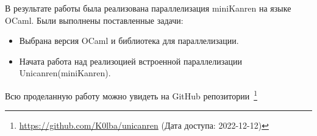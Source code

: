 

В результате работы была реализована параллелизация miniKanren на языке OCaml.
Были выполнены поставленные задачи:


\begin{itemize}
\item Выбрана версия OCaml и библиотека для параллелизации.
\item Начата работа над реализоцией встроенной параллелизации Unicanren(miniKanren).
\end{itemize}

Всю проделанную работу можно увидеть на GitHub репозитории~\footnote{\url{https://github.com/K0lba/unicanren} (Дата доступа: 2022-12-12)}





